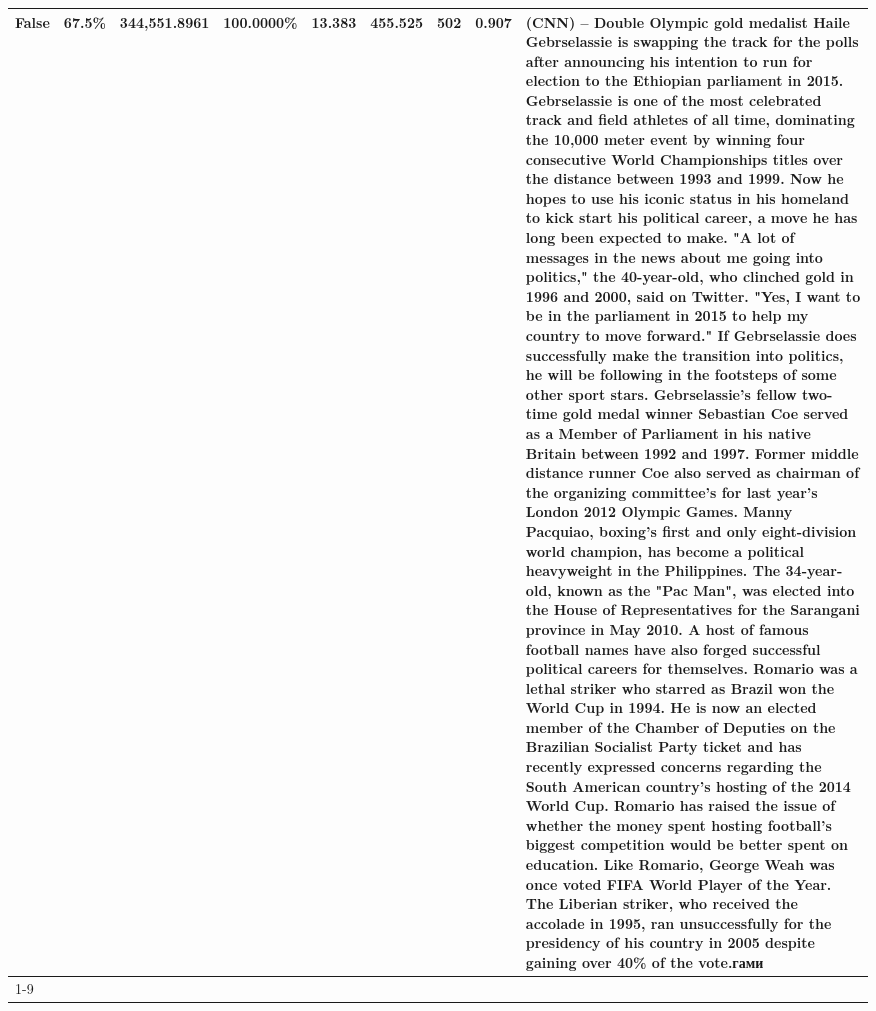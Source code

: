 \begin{table}[H]
{\begin{tabular}{lllrlllll}
False & 67.5\% & 344,551.8961 & \bfseries \color{red} 100.0000\% & 13.383 & 455.525 & 502 & 0.907 & (CNN) -- Double Olympic gold medalist Haile Gebrselassie is swapping the track for the polls after announcing his intention to run for election to the Ethiopian parliament in 2015. Gebrselassie is one of the most celebrated track and field athletes of all time, dominating the 10,000 meter event by winning four consecutive World Championships titles over the distance between 1993 and 1999. Now he hopes to use his iconic status in his homeland to kick start his political career, a move he has long been expected to make. "A lot of messages in the news about me going into politics," the 40-year-old, who clinched gold in 1996 and 2000, said on Twitter. "Yes, I want to be in the parliament in 2015 to help my country to move forward." If Gebrselassie does successfully make the transition into politics, he will be following in the footsteps of some other sport stars. Gebrselassie's fellow two-time gold medal winner Sebastian Coe served as a Member of Parliament in his native Britain between 1992 and 1997. Former middle distance runner Coe also served as chairman of the organizing committee's for last year's London 2012 Olympic Games. Manny Pacquiao, boxing's first and only eight-division world champion, has become a political heavyweight in the Philippines. The 34-year-old, known as the "Pac Man", was elected into the House of Representatives for the Sarangani province in May 2010. A host of famous football names have also forged successful political careers for themselves. Romario was a lethal striker who starred as Brazil won the World Cup in 1994. He is now an elected member of the Chamber of Deputies on the Brazilian Socialist Party ticket and has recently expressed concerns regarding the South American country's hosting of the 2014 World Cup. Romario has raised the issue of whether the money spent hosting football's biggest competition would be better spent on education. Like Romario, George Weah was once voted FIFA World Player of the Year. The Liberian striker, who received the accolade in 1995, ran unsuccessfully for the presidency of his country in 2005 despite gaining over 40\% of the vote.гами \\
\cline{1-9}

\end{tabular}}
\end{table}
